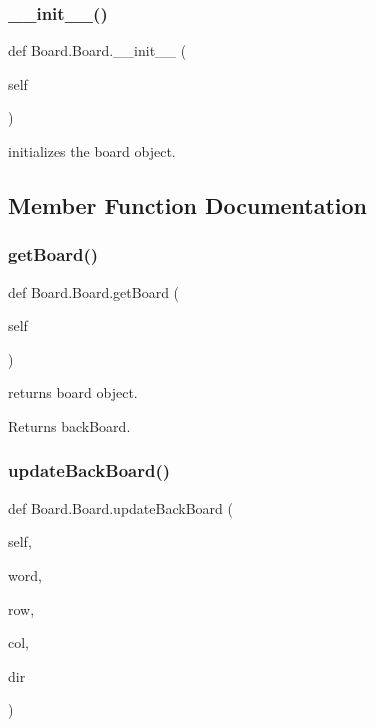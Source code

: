 \subsubsection{\texorpdfstring{\+\_\+\+\_\+init\+\_\+\+\_\+()}{\_\_init\_\_()}}
{\footnotesize\ttfamily def Board.\+Board.\+\_\+\+\_\+init\+\_\+\+\_\+ (\begin{DoxyParamCaption}\item[{}]{self }\end{DoxyParamCaption})}



initializes the board object. 



\subsection{Member Function Documentation}
\mbox{\label{class_board_1_1_board_abc0eb8a2cc667bb79692d7a31cb8d508}} 
\subsubsection{\texorpdfstring{get\+Board()}{getBoard()}}
{\footnotesize\ttfamily def Board.\+Board.\+get\+Board (\begin{DoxyParamCaption}\item[{}]{self }\end{DoxyParamCaption})}



returns board object. 

\begin{DoxyReturn}{Returns}
back\+Board. 
\end{DoxyReturn}
\mbox{\label{class_board_1_1_board_a289e0125aa7d2bf892c142bf1c46021b}} 
\subsubsection{\texorpdfstring{update\+Back\+Board()}{updateBackBoard()}}
{\footnotesize\ttfamily def Board.\+Board.\+update\+Back\+Board (\begin{DoxyParamCaption}\item[{}]{self,  }\item[{}]{word,  }\item[{}]{row,  }\item[{}]{col,  }\item[{}]{dir }\end{DoxyParamCaption})}



